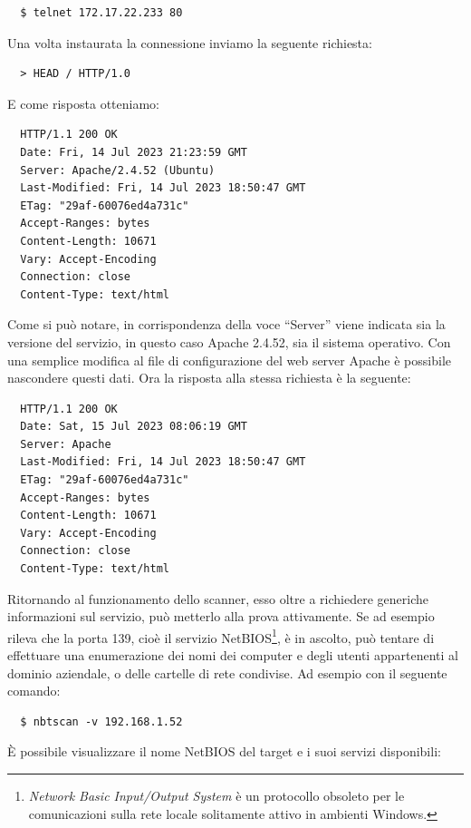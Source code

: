 \documentclass[target=bach,aauheader=]{thud}
\begin{document}
\begin{verbatim}
  $ telnet 172.17.22.233 80
\end{verbatim}

Una volta instaurata la connessione inviamo la seguente richiesta:

\begin{verbatim}
  > HEAD / HTTP/1.0
\end{verbatim}

E come risposta otteniamo:

\begin{verbatim}
  HTTP/1.1 200 OK
  Date: Fri, 14 Jul 2023 21:23:59 GMT
  Server: Apache/2.4.52 (Ubuntu)
  Last-Modified: Fri, 14 Jul 2023 18:50:47 GMT
  ETag: "29af-60076ed4a731c"
  Accept-Ranges: bytes
  Content-Length: 10671
  Vary: Accept-Encoding
  Connection: close
  Content-Type: text/html
\end{verbatim}

Come si può notare, in corrispondenza della voce “Server” viene indicata sia la versione del servizio, in questo caso Apache 2.4.52, sia il sistema operativo. Con una semplice modifica al file di configurazione del web server Apache è possibile nascondere questi dati. Ora la risposta alla stessa richiesta è la seguente:

\begin{verbatim}
  HTTP/1.1 200 OK
  Date: Sat, 15 Jul 2023 08:06:19 GMT
  Server: Apache
  Last-Modified: Fri, 14 Jul 2023 18:50:47 GMT
  ETag: "29af-60076ed4a731c"
  Accept-Ranges: bytes
  Content-Length: 10671
  Vary: Accept-Encoding
  Connection: close
  Content-Type: text/html
\end{verbatim}

Ritornando al funzionamento dello scanner, esso oltre a richiedere generiche informazioni sul servizio, può metterlo alla prova attivamente. Se ad esempio rileva che la porta 139, cioè il servizio NetBIOS\footnote{\textit{Network Basic Input/Output System} è un protocollo obsoleto per le comunicazioni sulla rete locale solitamente attivo in ambienti Windows.}, è in ascolto, può tentare di effettuare una enumerazione dei nomi dei computer e degli utenti appartenenti al dominio aziendale, o delle cartelle di rete condivise. Ad esempio con il seguente comando:

\begin{verbatim}
  $ nbtscan -v 192.168.1.52
\end{verbatim}

È possibile visualizzare il nome NetBIOS del target e i suoi servizi disponibili:
\end{document}
